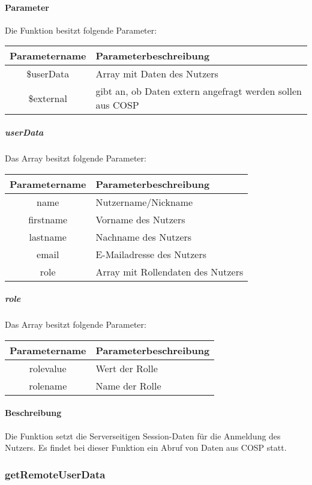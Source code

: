 \paragraph{Parameter} Die Funktion besitzt folgende Parameter:
\begin{table}[H]
	\begin{tabular}{|c|p{11cm}|}
		\hline
		\textbf{Parametername} & \textbf{Parameterbeschreibung} \\ \hline
		\$userData    & Array mit Daten des Nutzers \\ \hline
		\$external    & gibt an, ob Daten extern angefragt werden sollen aus {\glqq COSP\grqq} \\ \hline
	\end{tabular}
\end{table}
\subparagraph{userData} Das Array besitzt folgende Parameter:
\begin{table}[H]
	\begin{tabular}{|c|p{11cm}|}
		\hline
		\textbf{Parametername} & \textbf{Parameterbeschreibung} \\ \hline
		name      & Nutzername/Nickname \\ \hline
		firstname & Vorname des Nutzers \\ \hline
		lastname  & Nachname des Nutzers \\ \hline
		email     & E-Mailadresse des Nutzers \\ \hline
		role      & Array mit Rollendaten des Nutzers \\ \hline
	\end{tabular}
\end{table}
\subparagraph{role} Das Array besitzt folgende Parameter:
\begin{table}[H]
	\begin{tabular}{|c|p{11cm}|}
		\hline
		\textbf{Parametername} & \textbf{Parameterbeschreibung} \\ \hline
		rolevalue & Wert der Rolle \\ \hline
		rolename  & Name der Rolle \\ \hline
	\end{tabular}
\end{table}
\paragraph{Beschreibung} Die Funktion setzt die Serverseitigen Session-Daten für die Anmeldung des Nutzers.
Es findet bei dieser Funktion ein Abruf von Daten aus {\glqq COSP\grqq} statt.
\subsubsection{getRemoteUserData}
